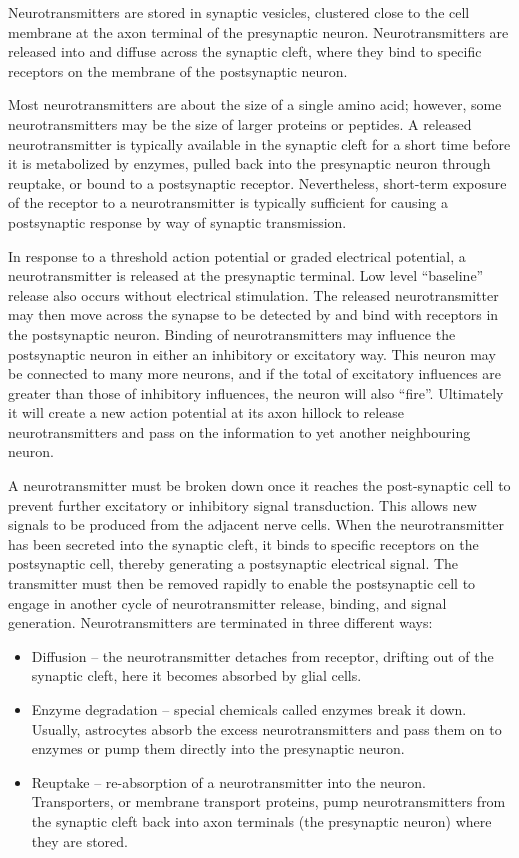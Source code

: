Neurotransmitters are stored in synaptic vesicles, clustered close to the cell membrane at the axon terminal of the presynaptic neuron. Neurotransmitters are released into and diffuse across the synaptic cleft, where they bind to specific receptors on the membrane of the postsynaptic neuron.

Most neurotransmitters are about the size of a single amino acid; however, some neurotransmitters may be the size of larger proteins or peptides. A released neurotransmitter is typically available in the synaptic cleft for a short time before it is metabolized by enzymes, pulled back into the presynaptic neuron through reuptake, or bound to a postsynaptic receptor. Nevertheless, short-term exposure of the receptor to a neurotransmitter is typically sufficient for causing a postsynaptic response by way of synaptic transmission.

In response to a threshold action potential or graded electrical potential, a neurotransmitter is released at the presynaptic terminal. Low level ``baseline'' release also occurs without electrical stimulation. The released neurotransmitter may then move across the synapse to be detected by and bind with receptors in the postsynaptic neuron. Binding of neurotransmitters may influence the postsynaptic neuron in either an inhibitory or excitatory way. This neuron may be connected to many more neurons, and if the total of excitatory influences are greater than those of inhibitory influences, the neuron will also ``fire''. Ultimately it will create a new action potential at its axon hillock to release neurotransmitters and pass on the information to yet another neighbouring neuron.

A neurotransmitter must be broken down once it reaches the post-synaptic cell to prevent further excitatory or inhibitory signal transduction. This allows new signals to be produced from the adjacent nerve cells. When the neurotransmitter has been secreted into the synaptic cleft, it binds to specific receptors on the postsynaptic cell, thereby generating a postsynaptic electrical signal. The transmitter must then be removed rapidly to enable the postsynaptic cell to engage in another cycle of neurotransmitter release, binding, and signal generation. Neurotransmitters are terminated in three different ways:

\begin{itemize}
\tightlist
\item
  Diffusion -- the neurotransmitter detaches from receptor, drifting out of the synaptic cleft, here it becomes absorbed by glial cells.
\item
  Enzyme degradation -- special chemicals called enzymes break it down. Usually, astrocytes absorb the excess neurotransmitters and pass them on to enzymes or pump them directly into the presynaptic neuron.
\item
  Reuptake -- re-absorption of a neurotransmitter into the neuron. Transporters, or membrane transport proteins, pump neurotransmitters from the synaptic cleft back into axon terminals (the presynaptic neuron) where they are stored.
\end{itemize}

